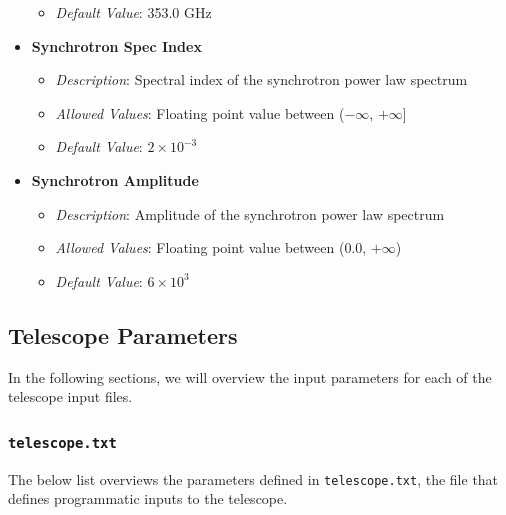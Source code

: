 \documentclass[11pt]{article} %
\begin{document}
\begin{itemize}[noitemsep,topsep=0pt]
\begin{itemize}[noitemsep,topsep=0pt]
		\item \textit{Default Value}: 353.0 GHz
		\end{itemize}
	\item \textbf{Synchrotron Spec Index}
		\begin{itemize}[noitemsep,topsep=0pt]
		\item \textit{Description}: Spectral index of the synchrotron power law spectrum
		\item \textit{Allowed Values}: Floating point value between ($-\infty$, $+\infty$]
		\item \textit{Default Value}: $2 \times 10^{-3}$
		\end{itemize}
	\item \textbf{Synchrotron Amplitude}
		\begin{itemize}[noitemsep,topsep=0pt]
		\item \textit{Description}: Amplitude of the synchrotron power law spectrum
		\item \textit{Allowed Values}: Floating point value between (0.0, $+\infty$)
		\item \textit{Default Value}: $6 \times 10^{3}$
		\end{itemize}
\end{itemize}


\subsection{Telescope Parameters}
\label{sec:telparams}

In the following sections, we will overview the input parameters for each of the telescope input files.


\subsubsection{\texttt{telescope.txt}}
\label{sec:telescope}

The below list overviews the parameters defined in \texttt{telescope.txt}, the file that defines programmatic inputs to the telescope.
\end{document}
